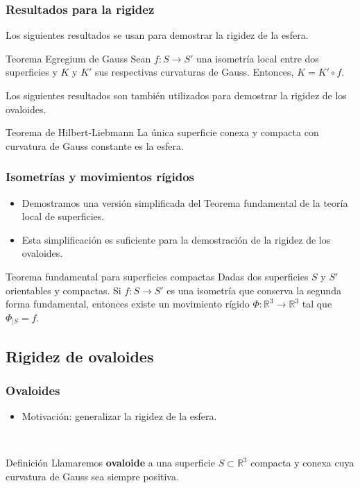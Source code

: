 \documentclass{beamer}
\begin{document}
	\begin{frame}
		\frametitle{Resultados para la rigidez}
		Los siguientes resultados se usan para demostrar la rigidez de la esfera.
		\begin{block}{Teorema Egregium de Gauss}
			Sean $f : S \to S'$ una isometría local entre dos superficies y $K$ y $K'$ sus respectivas curvaturas de Gauss. Entonces, $K = K'\circ f$.
		\end{block}
		Los siguientes resultados son también utilizados para demostrar la rigidez de los ovaloides.
		\begin{block}{Teorema de Hilbert-Liebmann}
			La única superficie conexa y compacta con curvatura de Gauss constante es la esfera.
		\end{block}
	\end{frame}
	
	\begin{frame}
		\frametitle{Isometrías y movimientos rígidos}
		
		\begin{itemize}
			\item Demostramos una versión simplificada del Teorema fundamental de la teoría local de superficies.
			\item Esta simplificación es suficiente para la demostración de la rigidez de los ovaloides.
		\end{itemize}
		
		
		
		
		\begin{block}{Teorema fundamental para superficies compactas}
			Dadas dos superficies $S$ y $S'$ orientables y compactas.
			Si $f : S \to S'$ es una isometría que conserva la segunda forma fundamental, entonces existe un movimiento rígido $\Phi : \mathbb{R}^3 \to \mathbb{R}^3$ tal que $\Phi_{\mid S} = f$.
		\end{block}
	\end{frame}
	
	
	\subsection{Rigidez de ovaloides}
	
	\begin{frame}
		\frametitle{Ovaloides}
		\begin{itemize}
			\item Motivación: generalizar la rigidez de la esfera.
		\end{itemize}
		${ }$\\
		\begin{block}{Definición}
			Llamaremos \textbf{ovaloide} a una superficie $S \subset \mathbb{R}^3$ compacta y conexa cuya curvatura de Gauss sea siempre positiva.
		\end{block}
	\end{frame}
	
\end{document}
